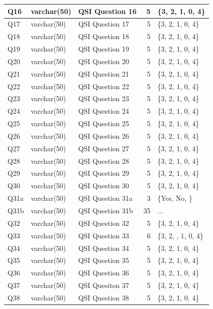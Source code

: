 \begin{landscape}
\begin{longtable}{|l|l|l|r|p{6cm}|}
\hline
Q16 & varchar(50) & QSI Question 16 & 5 & \{3, 2, 1, 0, 4\} \\
\hline
Q17 & varchar(50) & QSI Question 17 & 5 & \{3, 2, 1, 0, 4\} \\
\hline
Q18 & varchar(50) & QSI Question 18 & 5 & \{3, 2, 1, 0, 4\} \\
\hline
Q19 & varchar(50) & QSI Question 19 & 5 & \{3, 2, 1, 0, 4\} \\
\hline
Q20 & varchar(50) & QSI Question 20 & 5 & \{3, 2, 1, 0, 4\} \\
\hline
Q21 & varchar(50) & QSI Question 21 & 5 & \{3, 2, 1, 0, 4\} \\
\hline
Q22 & varchar(50) & QSI Question 22 & 5 & \{3, 2, 1, 0, 4\} \\
\hline
Q23 & varchar(50) & QSI Question 23 & 5 & \{3, 2, 1, 0, 4\} \\
\hline
Q24 & varchar(50) & QSI Question 24 & 5 & \{3, 2, 1, 0, 4\} \\
\hline
Q25 & varchar(50) & QSI Question 25 & 5 & \{3, 2, 1, 0, 4\} \\
\hline
Q26 & varchar(50) & QSI Question 26 & 5 & \{3, 2, 1, 0, 4\} \\
\hline
Q27 & varchar(50) & QSI Question 27 & 5 & \{3, 2, 1, 0, 4\} \\
\hline
Q28 & varchar(50) & QSI Question 28 & 5 & \{3, 2, 1, 0, 4\} \\
\hline
Q29 & varchar(50) & QSI Question 29 & 5 & \{3, 2, 1, 0, 4\} \\
\hline
Q30 & varchar(50) & QSI Question 30 & 5 & \{3, 2, 1, 0, 4\} \\
\hline
Q31a & varchar(50) & QSI Question 31a & 3 & \{Yes, No, \} \\
\hline
Q31b & varchar(50) & QSI Question 31b & 35 & ... \\
\hline
Q32 & varchar(50) & QSI Question 32 & 5 & \{3, 2, 1, 0, 4\} \\
\hline
Q33 & varchar(50) & QSI Question 33 & 6 & \{3, 2, , 1, 0, 4\} \\
\hline
Q34 & varchar(50) & QSI Question 34 & 5 & \{3, 2, 1, 0, 4\} \\
\hline
Q35 & varchar(50) & QSI Question 35 & 5 & \{3, 2, 1, 0, 4\} \\
\hline
Q36 & varchar(50) & QSI Question 36 & 5 & \{3, 2, 1, 0, 4\} \\
\hline
Q37 & varchar(50) & QSI Quesiton 37 & 5 & \{3, 2, 1, 0, 4\} \\
\hline
Q38 & varchar(50) & QSI Question 38 & 5 & \{3, 2, 1, 0, 4\} \\

\end{longtable}
\end{landscape}
